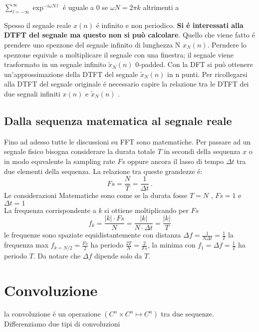 \documentclass[11pt,a4paper,DIV12,BCOR1.5mm]{scrartcl}
\begin{document}
$ \sum_{l=-\infty}^\infty    \exp^{-i\omega N\, l} $ é uguale a 0 se $\omega N = 2\pi k$ altrimenti a $ $

Spesso il segnale reale $x(n)$ é infinito e non periodico. \textbf{Si é interessati alla DTFT del segnale ma questo non si può calcolare}. Quello che viene fatto é prendere uno spezzone del segnale infinito di lunghezza N $x_N(n)$. Perndere lo spezzone equivale a moltiplicare il segnale con una finestra; il segnale viene trasformato in un segnale infinito $\tilde x_N(n)$ 0-padded. Con la DFT si può ottenere un'approssimazione della DTFT del segnale $\tilde x_N(n)$ in n punti.  Per ricollegarsi alla DTFT del segnale originale é necessario capire la relazione tra le DTFT dei due segnali infiniti $x(n)$ e $\tilde x_N(n)$ .\\



\subsection{Dalla sequenza matematica al segnale reale}

Fino ad adesso tutte le discussioni su FFT sono matematiche. Per passare ad un segnale fisico bisogna considerare la durata totale $T$ in secondi della sequenza $x$ o in modo equvalente la sampling rate $Fs$ oppure ancora il lasso di tempo $\Delta t$ tra due elementi della sequenza. La relazione tra queste grandezze é:
\begin{equation}
	Fs =  \frac{N}{T} = \frac{1}{ \Delta t }\,.
\end{equation}
Le considerazioni Matematiche sono come se la durata fosse $T=N$ , $Fs = 1$ e $\Delta t = 1$\\
La frequenza corrispondente a $k$ si ottiene moltiplicando per $Fs$ 
\begin{equation}
	f_k = \frac{|k|\cdot Fs}{N} = \frac{|k|}{N \cdot \Delta t}= \frac{|k|}{ T }
\end{equation} 
le frequenze sono spaziate equidistantemente con distanza $\Delta f=\frac{1}{N \Delta t} =\frac{1}{T} $ 
la frequenza max $f_{k=N/2} = \frac{Fs}{2} $ ha periodo  $\frac{2T}{N}=\frac{2}{Fs} $, la minima con $f_1=\Delta f=\frac{1}{T}$ ha periodo $T$. Da notare che $\Delta f$ dipende solo da $T$.

\section{Convoluzione}
la convoluzione é un operazione $(C^n\times C^n \mapsto C^n)$ tra due sequenze.
Differenziamo due tipi di convoluzioni
\end{document}
